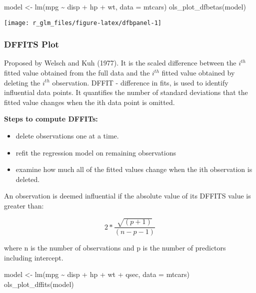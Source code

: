 \documentclass[
]{article}
\newenvironment{Shaded}{\begin{snugshade}}{\end{snugshade}}
\newcommand{\AttributeTok}[1]{\textcolor[rgb]{0.77,0.63,0.00}{#1}}
\newcommand{\FunctionTok}[1]{\textcolor[rgb]{0.00,0.00,0.00}{#1}}
\newcommand{\NormalTok}[1]{#1}
\newcommand{\OtherTok}[1]{\textcolor[rgb]{0.56,0.35,0.01}{#1}}
\newcommand{\SpecialCharTok}[1]{\textcolor[rgb]{0.00,0.00,0.00}{#1}}
\providecommand{\tightlist}{%
  \setlength{\itemsep}{0pt}\setlength{\parskip}{0pt}}
\begin{document}
\begin{Shaded}
\begin{Highlighting}[]
\NormalTok{model }\OtherTok{\textless{}{-}} \FunctionTok{lm}\NormalTok{(mpg }\SpecialCharTok{\textasciitilde{}}\NormalTok{ disp }\SpecialCharTok{+}\NormalTok{ hp }\SpecialCharTok{+}\NormalTok{ wt, }\AttributeTok{data =}\NormalTok{ mtcars)}
\FunctionTok{ols\_plot\_dfbetas}\NormalTok{(model)}
\end{Highlighting}
\end{Shaded}

\begin{center}\texttt{[image: r\_glm\_files/figure-latex/dfbpanel-1]} \end{center}

\hypertarget{dffits-plot}{%
\subsubsection{DFFITS Plot}\label{dffits-plot}}

Proposed by Welsch and Kuh (1977). It is the scaled difference between
the \(i^{th}\) fitted value obtained from the full data and the
\(i^{th}\) fitted value obtained by deleting the \(i^{th}\) observation.
DFFIT - difference in fits, is used to identify influential data points.
It quantifies the number of standard deviations that the fitted value
changes when the ith data point is omitted.

\textbf{Steps to compute DFFITs:}

\begin{itemize}
\tightlist
\item
  delete observations one at a time.
\item
  refit the regression model on remaining  observations
\item
  examine how much all of the fitted values change when the ith
  observation is deleted.
\end{itemize}

An observation is deemed influential if the absolute value of its DFFITS
value is greater than:

\[{2}*{\frac{\sqrt{(p + 1)}}{(n - p -1)}}\]

where n is the number of observations and p is the number of predictors
including intercept.

\begin{Shaded}
\begin{Highlighting}[]
\NormalTok{model }\OtherTok{\textless{}{-}} \FunctionTok{lm}\NormalTok{(mpg }\SpecialCharTok{\textasciitilde{}}\NormalTok{ disp }\SpecialCharTok{+}\NormalTok{ hp }\SpecialCharTok{+}\NormalTok{ wt }\SpecialCharTok{+}\NormalTok{ qsec, }\AttributeTok{data =}\NormalTok{ mtcars)}
\FunctionTok{ols\_plot\_dffits}\NormalTok{(model)}
\end{Highlighting}
\end{Shaded}
\end{document}
